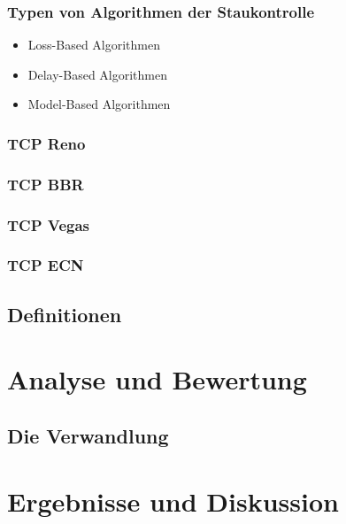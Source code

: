 \documentclass[paper=a4,fontsize=12pt,ngerman]{scrartcl}
\begin{document}
\subsubsection{Typen von Algorithmen der Staukontrolle}


    \begin{itemize}
        \item Loss-Based Algorithmen
        
        \item Delay-Based Algorithmen
        
        \item Model-Based Algorithmen
    \end{itemize}


\subsubsection{TCP Reno}

\subsubsection{TCP BBR} 

\subsubsection{TCP Vegas}

\subsubsection{TCP ECN}




\subsection{Definitionen}


\section{Analyse und Bewertung}


\subsection{Die Verwandlung}


\section{Ergebnisse und Diskussion}
\end{document}
